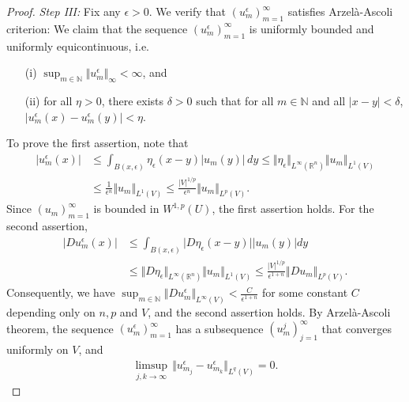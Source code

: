 \documentclass{article}
\numberwithin{equation}{section}
\newcommand{\bbN}{\mathbb{N}}
\newcommand{\bbR}{\mathbb{R}}
\theoremstyle{plain}
\theoremstyle{definition}
\begin{document}
\begin{proof}
\textit{Step III:} Fix any $\epsilon>0$. We verify that $(u_m^\epsilon)_{m=1}^\infty$ satisfies Arzelà-Ascoli criterion: We claim that the sequence $(u_m^\epsilon)_{m=1}^\infty$ is uniformly bounded and uniformly equicontinuous, i.e.
\begin{itemize}
	\item[(i)] $\sup_{m\in\bbN}\Vert u_m^\epsilon\Vert_\infty<\infty$, and
	\item[(ii)] for all $\eta>0$, there exists $\delta>0$ such that for all $m\in\bbN$ and all $\vert x-y\vert<\delta$, $\vert u^\epsilon_m(x)-u^\epsilon_m(y)\vert<\eta$.
\end{itemize}
To prove the first assertion, note that
\begin{align*}
	\vert u_m^\epsilon(x)\vert&\leq\int_{B(x,\epsilon)}\eta_\epsilon(x-y)\vert u_m(y)\vert\,dy\leq\Vert\eta_\epsilon\Vert_{L^\infty(\bbR^n)}\Vert u_m\Vert_{L^1(V)}\\
	&\leq\frac{1}{\epsilon^n}\Vert u_m\Vert_{L^1(V)}\leq\frac{\vert V\vert^{1/p}}{\epsilon^n}\Vert u_m\Vert_{L^p(V)}.
\end{align*}
Since $(u_m)_{m=1}^\infty$ is bounded in $W^{1,p}(U)$, the first assertion holds. For the second assertion,
\begin{align*}
	\vert Du^\epsilon_m(x)\vert&\leq\int_{B(x,\epsilon)}\vert D\eta_\epsilon(x-y)\vert\left\vert u_m(y)\right\vert dy\\
	&\leq\Vert D\eta_\epsilon\Vert_{L^\infty(\bbR^n)}\Vert u_m\Vert_{L^1(V)}\leq\frac{\vert V\vert^{1/p}}{\epsilon^{1+n}}\Vert Du_m\Vert_{L^p(V)}.
\end{align*}
Consequently, we have $\sup_{m\in\bbN}\Vert Du_m^\epsilon\Vert_{L^\infty(V)}<\frac{C}{\epsilon^{1+n}}$ for some constant $C$ depending only on $n,p$ and $V$, and the second assertion holds. By Arzelà-Ascoli theorem, the sequence $(u_m^\epsilon)_{m=1}^\infty$ has a subsequence $(u_m^j)_{j=1}^\infty$ that converges uniformly on $V$, and
\begin{align}
	\limsup_{j,k\to\infty}\,\bigl\Vert u^\epsilon_{m_j}-u^\epsilon_{m_k}\bigr\Vert_{L^q(V)}=0.\label{eq:4.14}
\end{align}


\end{proof}
\end{document}
